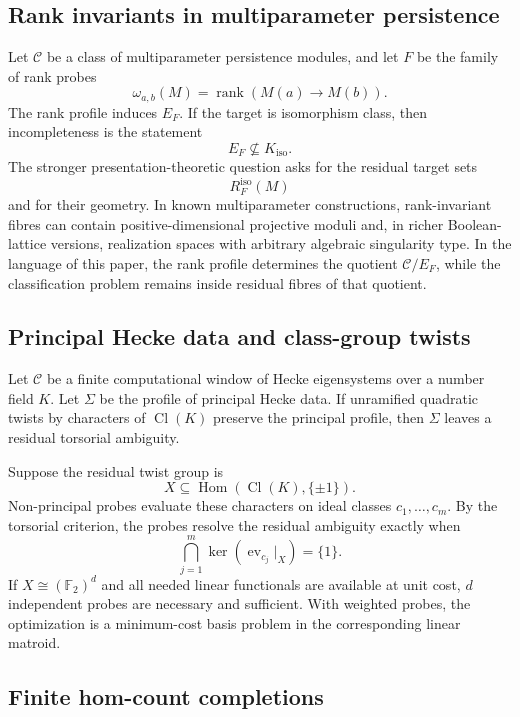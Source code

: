 \documentclass[11pt]{article}
\theoremstyle{definition}
\theoremstyle{remark}
\begin{document}
\subsection{Rank invariants in multiparameter persistence}

Let \(\mathcal C\) be a class of multiparameter persistence modules, and let \(F\) be the family of rank probes
\[
\omega_{a,b}(M)=\operatorname{rank}(M(a)\to M(b)).
\]
The rank profile induces \(E_F\).  If the target is isomorphism class, then incompleteness is the statement
\[
E_F\not\subseteq K_{\operatorname{iso}}.
\]
The stronger presentation-theoretic question asks for the residual target sets
\[
R_F^{\operatorname{iso}}(M)
\]
and for their geometry.  In known multiparameter constructions, rank-invariant fibres can contain positive-dimensional projective moduli and, in richer Boolean-lattice versions, realization spaces with arbitrary algebraic singularity type.  In the language of this paper, the rank profile determines the quotient \(\mathcal C/E_F\), while the classification problem remains inside residual fibres of that quotient.

\subsection{Principal Hecke data and class-group twists}

Let \(\mathcal C\) be a finite computational window of Hecke eigensystems over a number field \(K\).  Let \(\Sigma\) be the profile of principal Hecke data.  If unramified quadratic twists by characters of \(\operatorname{Cl}(K)\) preserve the principal profile, then \(\Sigma\) leaves a residual torsorial ambiguity.

Suppose the residual twist group is
\[
X\subseteq \operatorname{Hom}(\operatorname{Cl}(K),\{\pm1\}).
\]
Non-principal probes evaluate these characters on ideal classes \(c_1,\ldots,c_m\).  By the torsorial criterion, the probes resolve the residual ambiguity exactly when
\[
\bigcap_{j=1}^m\ker(\operatorname{ev}_{c_j}|_X)=\{1\}.
\]
If \(X\cong(\mathbb F_2)^d\) and all needed linear functionals are available at unit cost, \(d\) independent probes are necessary and sufficient.  With weighted probes, the optimization is a minimum-cost basis problem in the corresponding linear matroid.

\subsection{Finite hom-count completions}
\end{document}
